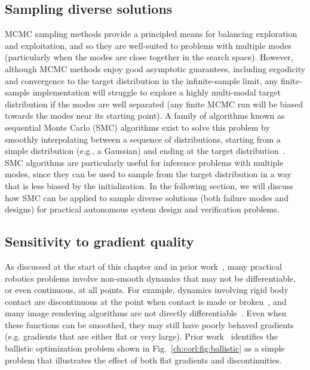\subsection{Sampling diverse solutions}

MCMC sampling methods provide a principled means for balancing exploration and exploitation, and so they are well-suited to problems with multiple modes (particularly when the modes are close together in the search space). However, although MCMC methods enjoy good asymptotic guarantees, including ergodicity and convergence to the target distribution in the infinite-sample limit, any finite-sample implementation will struggle to explore a highly multi-modal target distribution if the modes are well separated (any finite MCMC run will be biased towards the modes near its starting point). A family of algorithms known as sequential Monte Carlo (SMC) algorithms exist to solve this problem by smoothly interpolating between a sequence of distributions, starting from a simple distribution (e.g., a Gaussian) and ending at the target distribution~\cite{chopinIntroductionSequentialMonte2020}. SMC algorithms are particularly useful for inference problems with multiple modes, since they can be used to sample from the target distribution in a way that is less biased by the initialization. In the following section, we will discuss how SMC can be applied to sample diverse solutions (both failure modes and designs) for practical autonomous system design and verification problems.

\subsection{Sensitivity to gradient quality}

As discussed at the start of this chapter and in prior work~\cite{suhDifferentiableSimulatorsGive2022,suh2021_bundled_gradients}, many practical robotics problems involve non-smooth dynamics that may not be differentiable, or even continuous, at all points. For example, dynamics involving rigid body contact are discontinuous at the point when contact is made or broken~\cite{suhDifferentiableSimulatorsGive2022}, and many image rendering algorithms are not directly differentiable~\cite{zhaoPhysicsbasedDifferentiableRendering2020}. Even when these functions can be smoothed, they may still have poorly behaved gradients (e.g. gradients that are either flat or very large). Prior work~\cite{suhDifferentiableSimulatorsGive2022} identifies the ballistic optimization problem shown in Fig.~\ref{ch:corl:fig:ballistic} as a simple problem that illustrates the effect of both flat gradients and discontinuities.

